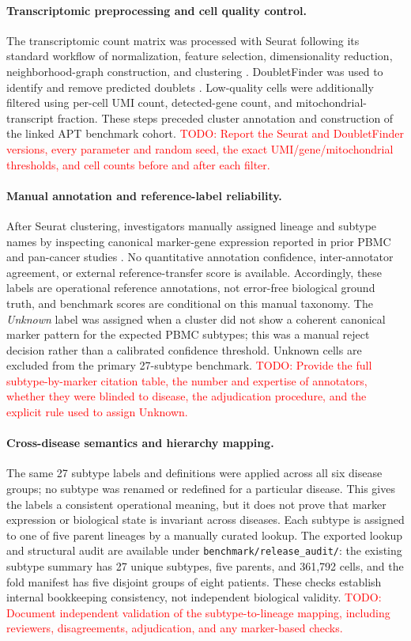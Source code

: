 \documentclass{article} %
\newcommand{\todo}[1]{\textcolor{red}{TODO: #1}}
\begin{document}
\paragraph{Transcriptomic preprocessing and cell quality control.}
The transcriptomic count matrix was processed with Seurat following its standard
workflow of normalization, feature selection, dimensionality reduction,
neighborhood-graph construction, and clustering \citep{hao2021integrated}.
DoubletFinder was used to identify and remove predicted doublets
\citep{mcginnis2019doubletfinder}. Low-quality cells were additionally filtered
using per-cell UMI count, detected-gene count, and mitochondrial-transcript
fraction. These steps preceded cluster annotation and construction of the linked
APT benchmark cohort. \todo{Report the Seurat and DoubletFinder versions, every
parameter and random seed, the exact UMI/gene/mitochondrial thresholds, and cell
counts before and after each filter.}

\paragraph{Manual annotation and reference-label reliability.}
After Seurat clustering, investigators manually assigned lineage and subtype
names by inspecting canonical marker-gene expression reported in prior PBMC and
pan-cancer studies \citep{zhang2024pan,yang2024pan}. No quantitative annotation
confidence, inter-annotator agreement, or external reference-transfer score is
available. Accordingly, these labels are operational reference annotations, not
error-free biological ground truth, and benchmark scores are conditional on this
manual taxonomy. The \emph{Unknown} label was assigned when a cluster did not show
a coherent canonical marker pattern for the expected PBMC subtypes; this was a
manual reject decision rather than a calibrated confidence threshold. Unknown
cells are excluded from the primary 27-subtype benchmark. \todo{Provide the full
subtype-by-marker citation table, the number and expertise of annotators, whether
they were blinded to disease, the adjudication procedure, and the explicit rule
used to assign Unknown.}

\paragraph{Cross-disease semantics and hierarchy mapping.}
The same 27 subtype labels and definitions were applied across all six disease
groups; no subtype was renamed or redefined for a particular disease. This gives
the labels a consistent operational meaning, but it does not prove that marker
expression or biological state is invariant across diseases. Each subtype is
assigned to one of five parent lineages by a manually curated lookup.
The exported lookup and structural audit are available under
\texttt{benchmark/release\_audit/}: the existing subtype summary has 27 unique
subtypes, five parents, and 361{,}792 cells, and the fold manifest has five
disjoint groups of eight patients. These checks establish internal bookkeeping
consistency, not independent biological validity.
\todo{Document independent validation of the subtype-to-lineage mapping, including
reviewers, disagreements, adjudication, and any marker-based checks.}
\end{document}
